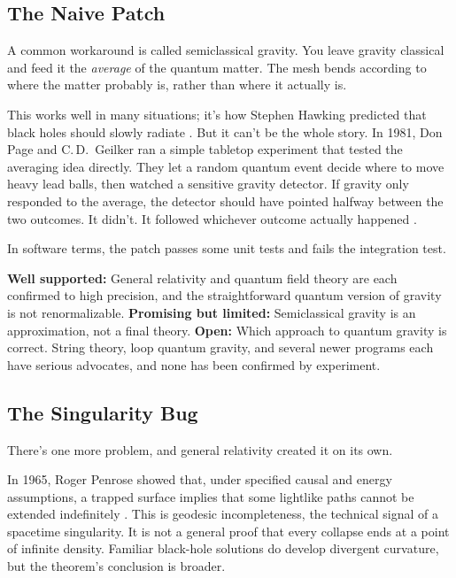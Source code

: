 \subsection{The Naive Patch}

A common workaround is called semiclassical gravity. You leave gravity classical and feed it the \emph{average} of the quantum matter. The mesh bends according to where the matter probably is, rather than where it actually is.

This works well in many situations; it's how Stephen Hawking predicted that black holes should slowly radiate \cite{hawking1975}. But it can't be the whole story. In 1981, Don Page and C.\,D.\ Geilker ran a simple tabletop experiment that tested the averaging idea directly. They let a random quantum event decide where to move heavy lead balls, then watched a sensitive gravity detector. If gravity only responded to the average, the detector should have pointed halfway between the two outcomes. It didn't. It followed whichever outcome actually happened \cite{pagegeilker1981}.

In software terms, the patch passes some unit tests and fails the integration test.

\begin{researchnotebox}
\textbf{Well supported:} General relativity and quantum field theory are each confirmed to high precision, and the straightforward quantum version of gravity is not renormalizable. \textbf{Promising but limited:} Semiclassical gravity is an approximation, not a final theory. \textbf{Open:} Which approach to quantum gravity is correct. String theory, loop quantum gravity, and several newer programs each have serious advocates, and none has been confirmed by experiment.
\end{researchnotebox}

\subsection{The Singularity Bug}

There's one more problem, and general relativity created it on its own.

In 1965, Roger Penrose showed that, under specified causal and energy assumptions, a trapped surface implies that some lightlike paths cannot be extended indefinitely \cite{penrose1965}. This is geodesic incompleteness, the technical signal of a spacetime singularity. It is not a general proof that every collapse ends at a point of infinite density. Familiar black-hole solutions do develop divergent curvature, but the theorem's conclusion is broader.

